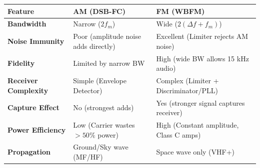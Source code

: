 \documentclass[11pt]{article}
\begin{document}
\begin{aretenir}
\begin{center}
\begin{tabularx}{\linewidth}{|l|X|X|}
\hline
\rowcolor{popblueL}
\textbf{Feature} & \textbf{AM (DSB-FC)} & \textbf{FM (WBFM)} \\ \hline
\textbf{Bandwidth} & Narrow ($2f_m$) & Wide ($2(\Delta f+f_m)$) \\ \hline
\textbf{Noise Immunity} & Poor (amplitude noise adds directly) & Excellent (Limiter rejects AM noise) \\ \hline
\textbf{Fidelity} & Limited by narrow BW & High (wide BW allows 15 kHz audio) \\ \hline
\textbf{Receiver Complexity} & Simple (Envelope Detector) & Complex (Limiter + Discriminator/PLL) \\ \hline
\textbf{Capture Effect} & No (strongest adds) & Yes (stronger signal captures receiver) \\ \hline
\textbf{Power Efficiency} & Low (Carrier wastes $>50\%$ power) & High (Constant amplitude, Class C amps) \\ \hline
\textbf{Propagation} & Ground/Sky wave (MF/HF) & Space wave only (VHF+) \\ \hline
\end{tabularx}
\end{center}
\end{aretenir}
\end{document}
